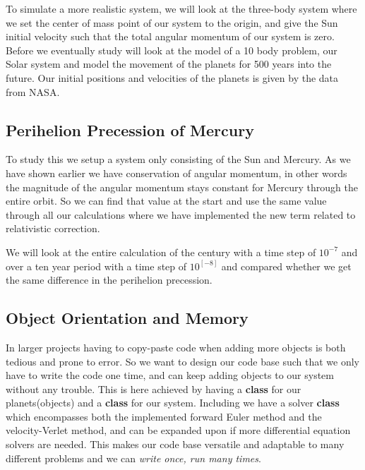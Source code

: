\documentclass[%
reprint,
nofootinbib,
amsmath,amssymb,
aps,
]{revtex4-1}
\begin{document}
To simulate a more realistic system, we will look at the three-body system where we set the center of mass point of our system to the origin, and give the Sun initial velocity such that the total angular momentum of our system is zero. 
Before we eventually study will look at the model of a 10 body problem, our Solar system and model the movement of the planets for 500 years into the future. Our initial positions and velocities of the planets is given by the data from NASA. 

\subsection{Perihelion Precession of Mercury}%
To study this we setup a system only consisting of the Sun and Mercury. As we have shown earlier we have conservation of angular momentum, in other words the magnitude of the angular momentum stays constant for Mercury through the entire orbit. So we can find that value at the start and use the same value through all our calculations where we have implemented the new term related to relativistic correction. 

We will look at the entire calculation of the century with a time step of $10^{-7}$ and over a ten year period with a time step of $10^[-8]$ and compared whether we get the same difference in the perihelion precession. 
\subsection{Object Orientation and Memory}%
In larger projects having to copy-paste code when adding more objects is both tedious and prone to error. So we want to design our code base such that we only have to write the code one time, and can keep adding objects to our system without any trouble. This is here achieved by having a \textbf{class} for our planets(objects) and a \textbf{class} for our system. 
Including we have a solver \textbf{class} which encompasses both the implemented forward Euler method and the velocity-Verlet method, and can be expanded upon if more differential equation solvers are needed. This makes our code base versatile and adaptable to many different problems and we can \textit{write once, run many times}. 
\end{document}
